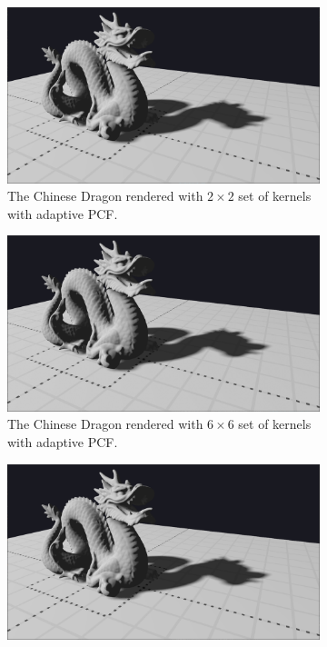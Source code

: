 \begin{figure}[h]
    \centering
    \begin{subfigure}[t]{0.45\textwidth}
		\centering
        \includegraphics[width=\textwidth]{./graf/tests/adaptive/cropped/dragon_adaptive_fhd_1024_2x2_8x8_offset5.png}
        \caption{The Chinese Dragon rendered with \(2\times 2\) set of kernels with adaptive PCF.}
    \end{subfigure}
	\hfill
    \begin{subfigure}[t]{0.45\textwidth}
		\centering
        \includegraphics[width=\textwidth]{./graf/tests/adaptive/cropped/dragon_adaptive_fhd_1024_6x6_8x8_offset5.png}
        \caption{The Chinese Dragon rendered with \(6\times 6\) set of kernels with adaptive PCF.}
    \end{subfigure}
    \begin{subfigure}[t]{0.45\textwidth}
		\centering
        \includegraphics[width=\textwidth]{./graf/tests/adaptive/cropped/dragon_adaptive_fhd_1024_14x14_8x8_offset5.png}

\end{subfigure}
\end{figure}
